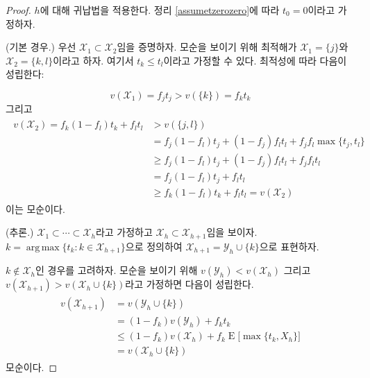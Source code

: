 \documentclass[11pt]{article} %
\DeclareMathOperator*{\argmax}{arg\,max}
\newif\ifen
\theoremstyle{definition}
\theoremstyle{definition}
\begin{document}
\begin{proof}\ifen
By induction on $h$. Applying Theorem \ref{assumetzerozero}, we assume that $t_0 = 0$. 

(Base case.) First, we will show that $\mathcal{X}_1 \subset \mathcal{X}_2$. To get a contradiction, suppose that the optima are $\mathcal{X}_1 = \{j\}$ and $\mathcal{X}_2 = \{k, l\}$, where we may assume that $t_k \leq t_l$. Optimality requires that
\else $h$에 대해 귀납법을 적용한다. 정리 \ref{assumetzerozero}에 따라 $t_0 = 0$이라고 가정하자. 

(기본 경우.) 우선 $\mathcal{X}_1 \subset \mathcal{X}_2$임을 증명하자. 모순을 보이기 위해 최적해가 $\mathcal{X}_1 = \{j\}$와 $\mathcal{X}_2 = \{k, l\}$이라고 하자. 여기서 $t_k \leq t_l$이라고 가정할 수 있다. 최적성에 따라 다음이 성립한다:
\fi
\begin{equation}v(\mathcal{X}_1 )  = f_j t_j > v(\{k\}) = f_k t_k\end{equation}
\ifen and \else 그리고\fi
\begin{align}
\begin{split}
v(\mathcal{X}_2) =  f_k (1- f_l) t_k + f_l t_l &> v(\{j, l\}) \\
& = f_j (1- f_l) t_j + (1- f_j) f_l t_l + f_j f_l \max\{t_j, t_l\} \\
&\geq  f_j (1- f_l) t_j + (1- f_j) f_l t_l + f_j f_l  t_l \\
&= f_j (1- f_l) t_j + f_l t_l  \\
&\geq f_k (1- f_l) t_k + f_l t_l  = v(\mathcal{X}_2)
\end{split}
\end{align}
\ifen which is a contradiction. 
\else 이는 모순이다.\fi

\ifen (Inductive step.) Assume that $\mathcal{X}_1 \subset \cdots \subset \mathcal{X}_h$, and we will show $\mathcal{X}_h \subset \mathcal{X}_{h+1}$. Let $k = \argmax\{ t_k: k \in \mathcal{X}_{h+1}\}$ and write $\mathcal{X}_{h+1} = \mathcal{Y}_{h} \cup \{k\}$.
\else (추론.) $\mathcal{X}_1 \subset \cdots \subset \mathcal{X}_h$라고 가정하고 $\mathcal{X}_h \subset \mathcal{X}_{h+1}$임을 보이자. $k = \argmax\{ t_k: k \in \mathcal{X}_{h+1}\}$으로 정의하여 $\mathcal{X}_{h+1} = \mathcal{Y}_{h} \cup \{k\}$으로 표현하자.\fi

\ifen Suppose $k \notin \mathcal{X}_h$. To get a contradiction, suppose that $v(\mathcal{Y}_h) < v(\mathcal{X}_h)$ and  $v(\mathcal{X}_{h+1}) > v(\mathcal{X}_h \cup \{k\})$. Then
\else $k \notin \mathcal{X}_h$인 경우를 고려하자. 모순을 보이기 위해 $v(\mathcal{Y}_h) < v(\mathcal{X}_h)$ 그리고 $v(\mathcal{X}_{h+1}) > v(\mathcal{X}_h \cup \{k\})$라고 가정하면 다음이 성립한다. \fi
\begin{align}
\begin{split}
v(\mathcal{X}_{h+1})&= v(\mathcal{Y}_{h} \cup \{k\}) \\
&= (1 - f_k) v(\mathcal{Y}_h) + f_k t_k \\
&\leq (1 - f_k) v(\mathcal{X}_h) + f_k \operatorname{E}\bigl[ \max\{t_k, X_h\}\bigr]\\
&=  v(\mathcal{X}_h\cup \{k\})
\end{split}
\end{align}
\ifen is a contradiction.
\else 모순이다.\fi


\end{proof}
\end{document}
